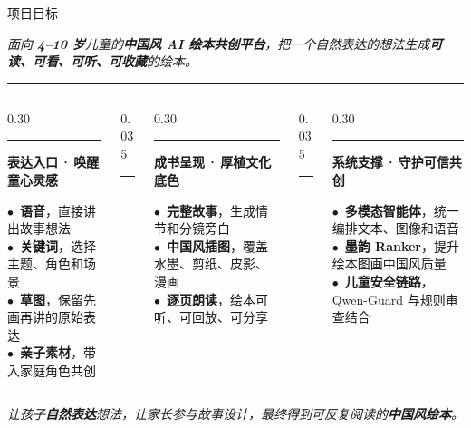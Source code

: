 \documentclass{beamer}
\newcommand{\kw}[1]{\textcolor{importantred}{\textbf{#1}}}
\newcommand{\goldrule}{\par\vspace{3pt}\noindent\textcolor{accentgold!60}{\rule{\linewidth}{0.4pt}}\par\vspace{3pt}}
\newcommand{\sidehead}[2][buptred]{%
  {\color{#1}\rule[-0.15em]{2.5pt}{1.0em}}\hspace{0.45em}\textbf{\small\color{darkred}#2}\par
  \vspace{2pt}%
}
\newcommand{\heroline}[1]{%
  {\centering\color{darkred}\itshape\small #1\par}%
}
\newcommand{\heroLG}[1]{%
  {\centering\color{darkred}\itshape\normalsize #1\par}%
}
\newcommand{\redot}{\textcolor{buptred}{\scriptsize$\bullet$}~}
\newcommand{\golddot}{\textcolor{accentgold}{\scriptsize$\bullet$}~}
\begin{document}
\begin{frame}[t]{项目目标}
    \vspace{0.05cm}
    \heroLG{面向 \kw{4--10 岁}儿童的\textbf{中国风 AI 绘本共创平台}，把一个自然表达的想法生成\textbf{可读、可看、可听、可收藏}的绘本。}
    \goldrule
    \vspace{0.18cm}

    \begin{columns}[T, onlytextwidth]
        \begin{column}[T]{0.30\linewidth}
            \sidehead{表达入口\,·\,唤醒童心灵感}
            \scriptsize
            \redot \textbf{语音}，直接讲出故事想法\\[2pt]
            \redot \textbf{关键词}，选择主题、角色和场景\\[2pt]
            \redot \textbf{草图}，保留先画再讲的原始表达\\[2pt]
            \redot \textbf{亲子素材}，带入家庭角色共创
        \end{column}
        \begin{column}[T]{0.035\linewidth}
            \centering\textcolor{accentgold!60}{\rule{0.4pt}{4.4em}}
        \end{column}
        \begin{column}[T]{0.30\linewidth}
            \sidehead[accentgold]{成书呈现\,·\,厚植文化底色}
            \scriptsize
            \golddot \textbf{完整故事}，生成情节和分镜旁白\\[2pt]
            \golddot \textbf{中国风插图}，覆盖水墨、剪纸、皮影、漫画\\[2pt]
            \golddot \textbf{逐页朗读}，绘本可听、可回放、可分享
        \end{column}
        \begin{column}[T]{0.035\linewidth}
            \centering\textcolor{accentgold!60}{\rule{0.4pt}{4.4em}}
        \end{column}
        \begin{column}[T]{0.30\linewidth}
            \sidehead{系统支撑\,·\,守护可信共创}
            \scriptsize
            \redot \textbf{多模态智能体}，统一编排文本、图像和语音\\[2pt]
            \redot \textbf{墨韵 Ranker}，提升绘本图画中国风质量\\[2pt]
            \redot \textbf{儿童安全链路}，Qwen-Guard 与规则审查结合
        \end{column}
    \end{columns}

    \vspace{0.36cm}
    \heroline{让孩子\textbf{自然表达}想法，让家长参与故事设计，最终得到可反复阅读的\textbf{中国风绘本}。}
\end{frame}
\end{document}
